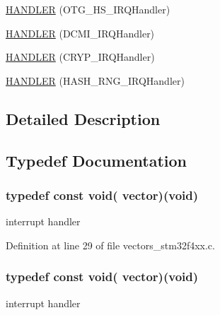 \begin{DoxyCompactItemize}
\item 
\hyperlink{group___p_i_o_s_ga5311b7f23d19c0fb8b696d2759202e76}{H\-A\-N\-D\-L\-E\-R} (O\-T\-G\-\_\-\-H\-S\-\_\-\-I\-R\-Q\-Handler)
\item 
\hyperlink{group___p_i_o_s_ga3aa6cb3ec72ada671e5942718f69efa5}{H\-A\-N\-D\-L\-E\-R} (D\-C\-M\-I\-\_\-\-I\-R\-Q\-Handler)
\item 
\hyperlink{group___p_i_o_s_ga2b36ce025c75d394fbdc509201d8b237}{H\-A\-N\-D\-L\-E\-R} (C\-R\-Y\-P\-\_\-\-I\-R\-Q\-Handler)
\item 
\hyperlink{group___p_i_o_s_ga256101589d80098fdf7e10440c2fca7d}{H\-A\-N\-D\-L\-E\-R} (H\-A\-S\-H\-\_\-\-R\-N\-G\-\_\-\-I\-R\-Q\-Handler)
\end{DoxyCompactItemize}


\subsection{Detailed Description}


\subsection{Typedef Documentation}
\hypertarget{group___p_i_o_s_ga3c46a32d92954306e54f6e9acdd9eaac}{
\subsubsection[{vector}]{\setlength{\rightskip}{0pt plus 5cm}typedef {\bf const} {\bf void}( vector)({\bf void})}}\label{group___p_i_o_s_ga3c46a32d92954306e54f6e9acdd9eaac}
interrupt handler 

Definition at line 29 of file vectors\-\_\-stm32f4xx.\-c.

\hypertarget{group___p_i_o_s_ga3c46a32d92954306e54f6e9acdd9eaac}{
\subsubsection[{vector}]{\setlength{\rightskip}{0pt plus 5cm}typedef {\bf const} {\bf void}( vector)({\bf void})}}\label{group___p_i_o_s_ga3c46a32d92954306e54f6e9acdd9eaac}
interrupt handler 

